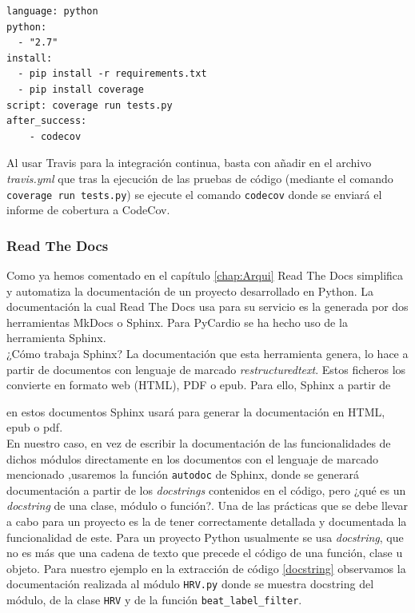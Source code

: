 \begin{lstlisting}[caption={\texttt{.travis.yml} para integrar CodeCov},label=travisCodecov]
language: python
python:
  - "2.7"
install:
  - pip install -r requirements.txt
  - pip install coverage
script: coverage run tests.py
after_success:
    - codecov
\end{lstlisting}

Al usar Travis para la integración continua, basta con añadir en el archivo  \textit{travis.yml} que tras la ejecución de las pruebas de código (mediante el comando \texttt{coverage run tests.py}) se ejecute el comando \texttt{codecov} donde se enviará el informe de cobertura a CodeCov. 

\subsubsection*{Read The Docs}
\label{subusub:rtd}
Como ya hemos comentado en el capítulo \ref{chap:Arqui} Read The Docs simplifica y automatiza la documentación de un proyecto desarrollado en Python. La documentación la cual Read The Docs usa para su servicio es la generada por dos herramientas MkDocs o Sphinx. Para PyCardio se ha hecho uso de la herramienta Sphinx. \\
¿Cómo trabaja Sphinx? La documentación que esta herramienta genera, lo hace a partir de documentos con lenguaje de marcado \textit{restructuredtext}. Estos ficheros los convierte en formato web (HTML), PDF o epub. Para ello, Sphinx a partir de  

en estos documentos Sphinx usará para generar la documentación en HTML, epub o pdf.\\


En nuestro caso, en vez de escribir la documentación de las funcionalidades de dichos módulos directamente en los documentos con el lenguaje de marcado mencionado ,usaremos la función \texttt{autodoc} de Sphinx, donde se generará documentación a partir de los \textit{docstrings} contenidos en el código, pero ¿qué es un \textit{docstring} de una clase, módulo o función?. Una de las prácticas que se debe llevar a cabo para un proyecto es la de tener correctamente detallada y documentada la funcionalidad de este. Para un proyecto Python usualmente se usa \textit{docstring}, que no es más que una cadena de texto que precede el código de una función, clase u objeto. Para nuestro ejemplo en la extracción de código \ref{docstring} observamos la documentación realizada al módulo \texttt{HRV.py} donde se muestra docstring del módulo, de la clase \texttt{HRV} y de la función \texttt{beat\_label\_filter}.

